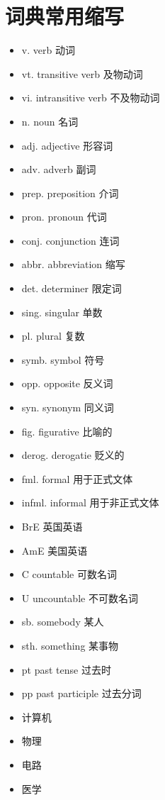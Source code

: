\chapter*{词典常用缩写}
\begin{multicols}{2}
    \begin{itemize}[left=0em]
        \item v. verb 动词
        \item vt. transitive verb 及物动词
        \item vi. intransitive verb 不及物动词
        \item n. noun 名词
        \item adj. adjective 形容词
        \item adv. adverb 副词
        \item prep. preposition 介词
        \item pron. pronoun 代词
        \item conj. conjunction 连词
        \item abbr. abbreviation 缩写
        \item det. determiner 限定词
        \item sing. singular 单数
        \item pl. plural 复数
        \item symb. symbol 符号
        \item opp. opposite 反义词
        \item syn. synonym 同义词
        \item fig. figurative 比喻的
        \item derog. derogatie 贬义的
        \item fml. formal 用于正式文体
        \item infml. informal 用于非正式文体
        \item BrE 英国英语
        \item AmE 美国英语
        \item C countable 可数名词
        \item U uncountable 不可数名词
        \item sb. somebody 某人
        \item sth. something 某事物
        \item pt past tense 过去时
        \item pp past participle 过去分词
        \item \quad[计] 计算机
        \item \quad[物] 物理
        \item \quad[电] 电路
        \item \quad[医] 医学
    \end{itemize}
\end{multicols}
